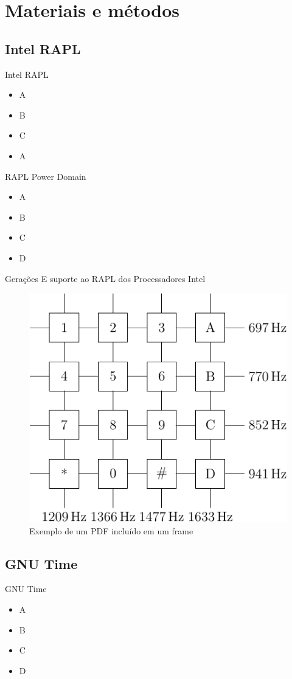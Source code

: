 \section{Materiais e métodos}

\subsection{Intel RAPL}
\begin{frame}{Intel RAPL}
    \begin{itemize}
        \item A
        \item B
        \item C 
        \item A
    \end{itemize}
\end{frame}

\begin{frame}{RAPL Power Domain}
    \begin{itemize}
        \item A
        \item B
        \item C 
        \item D 
    \end{itemize}
\end{frame}

\begin{frame}{Gerações E suporte ao RAPL dos Processadores Intel}
        \begin{figure}
            \centering
            \includegraphics[width=0.35\linewidth]{images/dtmf.pdf}
            \caption{Exemplo de um PDF incluído em um frame}
            \label{fig:example}
        \end{figure}
\end{frame}

\subsection{GNU Time}
\begin{frame}{GNU Time}
    \begin{itemize}
        \item A
        \item B
        \item C 
        \item D 
    \end{itemize}
\end{frame}

